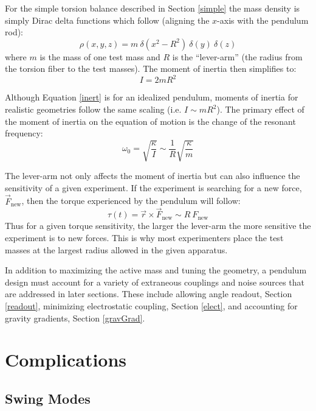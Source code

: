 \documentclass{book}
\begin{document}
For the simple torsion balance described in Section \ref{simple} the mass density is simply Dirac delta functions which follow (aligning the $x$-axis with the pendulum rod):
\begin{equation}
\rho(x,y,z)  = m\ \delta(x^2-R^2)\ \delta(y)\ \delta(z)
\end{equation}
where $m$ is the mass of one test mass and $R$ is the ``lever-arm'' (the radius from the torsion fiber to the test masses). The moment of inertia then simplifies to:
\begin{equation}
I=2 m R^2 \label{inert}
\end{equation}

Although Equation \ref{inert} is for an idealized pendulum, moments of inertia for realistic geometries follow the same scaling (i.e. $I\sim mR^2$). The primary effect of the moment of inertia on the equation of motion is the change of the resonant frequency:
\begin{equation}
\omega_0=\sqrt{\frac{\kappa}{I}}\sim \frac{1}{R} \sqrt{\frac{\kappa}{m}}
\end{equation}

The lever-arm not only affects the moment of inertia but can also influence the sensitivity of a given experiment. If the experiment is searching for a new force, $\vec{F}_\text{new}$, then the torque experienced by the pendulum will follow:
\begin{equation}
\tau(t)=\vec{r} \times \vec{F}_\text{new}\sim R\ F_\text{new}
\end{equation}
Thus for a given torque sensitivity, the larger the lever-arm the more sensitive the experiment is to new forces. This is why most experimenters place the test masses at the largest radius allowed in the given apparatus.

In addition to maximizing the active mass and tuning the geometry, a pendulum design must account for a variety of extraneous couplings and noise sources that are addressed in later sections. These include allowing angle readout, Section \ref{readout}, minimizing electrostatic coupling, Section \ref{elect}, and accounting for gravity gradients, Section \ref{gravGrad}. 

\chapter{Complications}
\section{Swing Modes} \label{swing}
\end{document}
